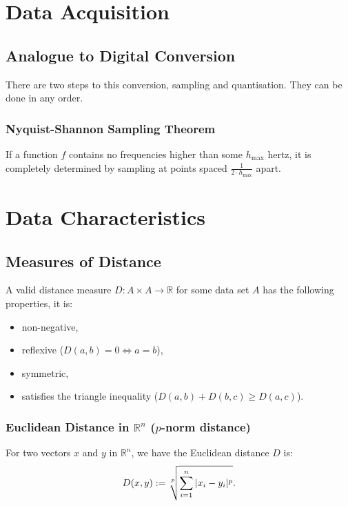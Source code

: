 \section{Data Acquisition}

\subsection{Analogue to Digital Conversion}

There are two steps to this conversion, sampling and quantisation.
They can be done in any order.

\subsubsection{Nyquist-Shannon Sampling Theorem}
If a function $f$ contains no frequencies higher than some
$h_{\text{max}}$ hertz, it is completely determined by
sampling at points spaced $\frac{1}{2 \cdot h_{\text{max}}}$
apart.

\section{Data Characteristics}

\subsection{Measures of Distance}

A valid distance measure $D : A \times A \to \mathbb{R}$
for some data set $A$ has the following properties, it is: \begin{itemize}
    \item non-negative,
    \item reflexive ($D(a, b) = 0 \Longleftrightarrow a = b$),
    \item symmetric,
    \item satisfies the triangle inequality
    ($D(a, b) + D(b, c) \geq D(a, c)$).
\end{itemize}

\subsubsection{Euclidean Distance in $\mathbb{R}^n$ ($p$-norm distance)}

For two vectors $x$ and $y$ in $\mathbb{R}^n$, we have the Euclidean
distance $D$ is: \begin{gather*}
    D(x, y) := \sqrt[\uproot{2}p]{\sum_{i = 1}^n |x_i - y_i|^p}.
\end{gather*}

